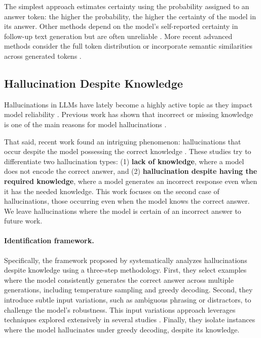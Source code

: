 The simplest approach estimates certainty using the probability assigned to an answer token: the higher the probability, the higher the certainty of the model in its answer.
Other methods depend on the model's self-reported certainty in follow-up text generation but are often unreliable \cite{yona2024can,beigi2024rethinking}.
More recent advanced methods consider the full token distribution \cite{huang2023look} or incorporate semantic similarities across generated tokens \cite{kuhn2023semantic}. 




\subsection{Hallucination Despite Knowledge}\label{subsec:background_hallucinations}


Hallucinations in LLMs have lately become a highly active topic as they impact model reliability \citep{Towards_understanding_sycophancy_in_language_models,dola,LLM_Polygraph,The_internal_state_of_an_llm_knows_when_its_lying,How_to_catch_an_ai_liar}.
Previous work has shown that incorrect or missing knowledge is one of the main reasons for model hallucinations \citep{bechard2024reducing,perkovic2024hallucinations}.


That said, recent work found an intriguing phenomenon: hallucinations that occur despite the model possessing the correct knowledge \cite{simhi2024distinguishing,anthropic_hk_hall,burger2024truth}. These studies try to differentiate two hallucination types: (1) \textbf{lack of knowledge}, where a model does not encode the correct answer, and (2) \textbf{hallucination despite having the required knowledge}, where a model generates an incorrect response even when it has the needed knowledge.
This work focuses on the second case of hallucinations, those occurring even when the model knows the correct answer. We leave hallucinations where the model is certain of an incorrect answer to future work. 


\paragraph{Identification framework.} Specifically, the framework proposed by \citet{simhi2024distinguishing} systematically analyzes hallucinations despite knowledge using a three-step methodology. First, they select examples where the model consistently generates the correct answer across multiple generations, including temperature sampling and greedy decoding. Second, they introduce subtle input variations, such as ambiguous phrasing or distractors, to challenge the model’s robustness. This input variations approach leverages techniques explored extensively in several studies \citep{zeng2024johnny,li2024measuring,flat_earth,yao2023llm,The_Waluigi_Effect,Personas,How_to_catch_an_ai_liar}. Finally, they isolate instances where the model hallucinates under greedy decoding, despite its knowledge.

